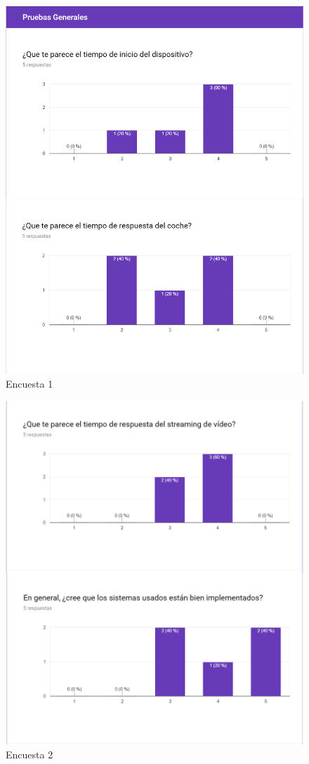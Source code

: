 \documentclass{pclass}
\begin{document}
\begin{figure}[H]
	\centering
	\includegraphics[width=1\textwidth]{img/primera}
	\caption{Encuesta 1}
	\label{fig:primeraEncuesta}
\end{figure}

\begin{figure}[H]
	\centering
	\includegraphics[width=1\textwidth]{img/segunda}
	\caption{Encuesta 2}
	\label{fig:segundaEncuesta}
\end{figure}
\end{document}
